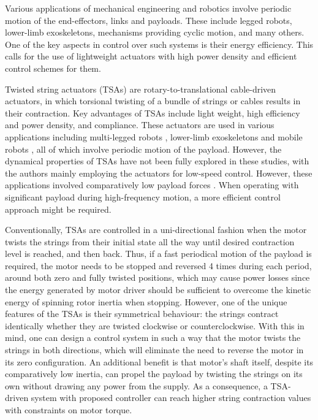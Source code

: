 Various applications of mechanical engineering and robotics involve periodic motion of the end-effectors, links and payloads. These include legged robots, lower-limb exoskeletons, mechanisms providing cyclic motion, and many others. One of the key aspects in control over such systems is their energy efficiency. This calls for the use of lightweight actuators with high power density and efficient control schemes for them. 

Twisted string actuators (TSAs) are rotary-to-translational cable-driven actuators, in which torsional twisting of a bundle of strings or cables results in their contraction. Key advantages of TSAs include light weight, high efficiency and power density, and compliance. These actuators are used in various applications including multi-legged robots \cite{suzuki2005toward}, lower-limb exoskeletons \cite{kornbluh2018twisted} and mobile robots \cite{sabelhaus2015system}, all of which involve periodic motion of the payload. However, the dynamical properties of TSAs have not been fully explored in these studies, with the authors mainly employing the actuators for low-speed control. However, these applications involved comparatively low payload forces \cite{nedelchev2020accurate}. When operating with significant payload during high-frequency motion, a more efficient control approach might be required.

Conventionally, TSAs are controlled in a uni-directional fashion when the motor twists the strings from their initial state all the way until desired contraction level is reached, and then back. Thus, if a fast periodical motion of the payload is required, the motor needs to be stopped and reversed 4 times during each period, around both zero and fully twisted positions, which may cause power losses since the energy generated by motor driver should be sufficient to overcome the kinetic energy of spinning rotor inertia when stopping. However, one of the unique features of the TSAs is their symmetrical behaviour: the strings contract identically whether they are twisted clockwise or counterclockwise. With this in mind, one can design a control system in such a way that the motor twists the strings in both directions, which will eliminate the need to reverse the motor in its zero configuration. An additional benefit is that motor's shaft itself, despite its comparatively low inertia, can propel the payload by twisting the strings on its own without drawing any power from the supply. As a consequence, a TSA-driven system with proposed controller can reach higher string contraction values with constraints on motor torque.


